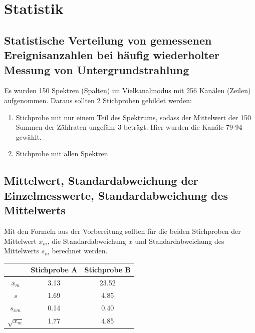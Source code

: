 \documentclass[a4paper,titlepage]{scrartcl}
\numberwithin{equation}{section}
\begin{document}
\section{Statistik}
\subsection{Statistische Verteilung von gemessenen Ereignisanzahlen bei häufig wiederholter Messung von Untergrundstrahlung}
Es wurden 150 Spektren (Spalten) im Vielkanalmodus mit 256 Kanälen (Zeilen) aufgenommen. Daraus sollten 2 Stichproben gebildet werden:
\begin{enumerate}
\item Stichprobe mit nur einem Teil des Spektrums, sodass der Mittelwert der 150 Summen der Zählraten ungefähr 3 beträgt. Hier wurden die Kanäle 79-94 gewählt.
\item Stichprobe mit allen Spektren
\end{enumerate}
\subsection{Mittelwert, Standardabweichung der Einzelmesswerte, Standardabweichung des Mittelwerts}
Mit den Formeln aus der Vorbereitung sollten für die beiden Stichproben der Mittelwert $x_m$, die Standardabweichung $x$ und Standardabweichung des Mittelwerts $s_m$ berechnet werden.
\begin{table}[H]
\begin{tabular}{c|c|c}
	& Stichprobe A & Stichprobe B\\
	\hline
	$x_m$ & 3.13 & 23.52\\
	$s$ & 1.69 & 4.85\\
	$s_{xm}$ & 0.14 & 0.40\\
	$\sqrt{x_m}$ & 1.77 & 4.85\\
\end{tabular}
\end{table}
\end{document}
